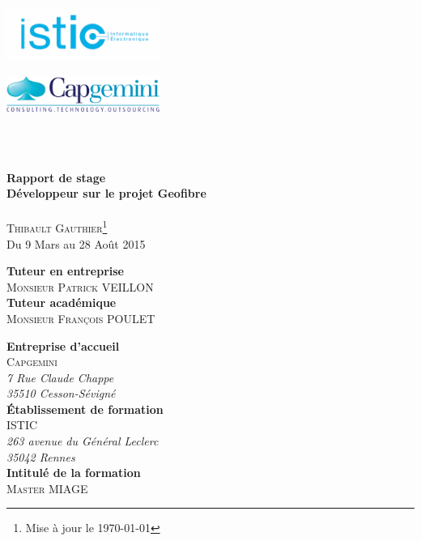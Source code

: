 \begin{titlepage}
  \begin{minipage}[t]{7cm} %
    \flushleft \includegraphics[width = 5cm]{images/logo_istic.png}
  \end{minipage}
  \hfill
  \begin{minipage}[t]{7cm}
    \flushright \includegraphics[width = 5cm]{images/logo_capgemini.png}
  \end{minipage}
  \\[2cm]
  \begin{center}
    \hr\\[0.5cm]
    {\huge\textbf{Rapport de stage }}\\[0.4cm]
    {\large\textbf{Développeur sur le projet Geofibre}}\\[0.4cm]
    \hr\\[0.5cm]
    \textsc{Thibault Gauthier\footnote{Mise à jour le \today}}\\[0.4cm]
    Du 9 Mars au 28 Août 2015\\[2.5cm]
  \end{center}
  \begin{minipage}[t]{8cm} %
    \textbf{Tuteur en entreprise}\\
    \textsc{Monsieur Patrick VEILLON}\\[0.5cm]
    \textbf{Tuteur académique}\\
    \textsc{Monsieur François POULET}
  \end{minipage}
  \hfill
  \begin{minipage}[t]{8cm}
    \textbf{Entreprise d'accueil} \\
    \textsc{Capgemini}\\
    \textit{7 Rue Claude Chappe\\
    35510 Cesson-Sévigné}\\[0.5cm]
    \textbf{\'Etablissement de formation}\\
    \textsc{ISTIC\footnotemark}\\
    \textit{263 avenue du Général Leclerc\\
    35042 Rennes}\\[0.5cm]
    \textbf{Intitulé de la formation}\\
    \textsc{Master MIAGE\footnotemark}

  \end{minipage}
  \addtocounter{footnote}{-2} %

\end{titlepage}
